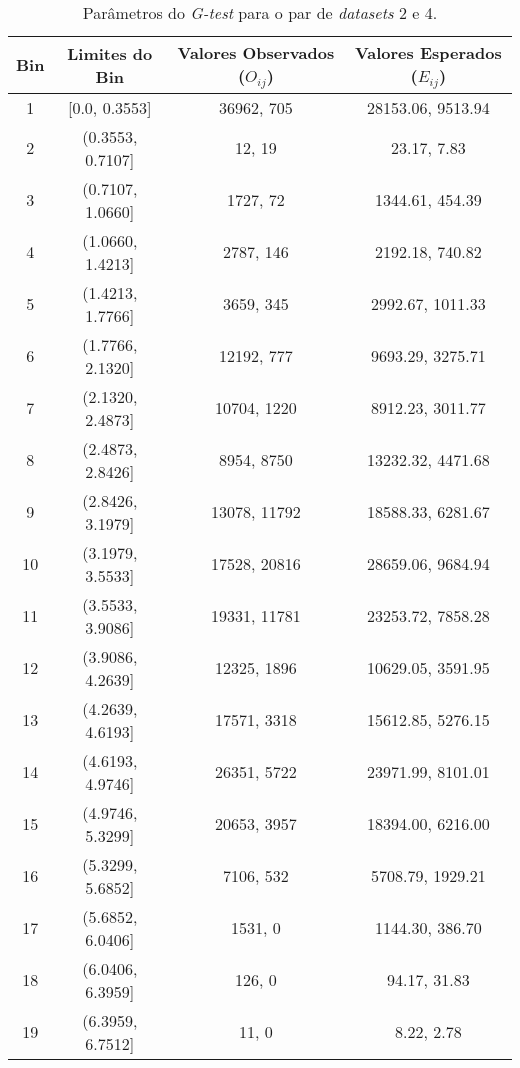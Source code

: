 \begin{table}[H]
    \centering
    \caption{Parâmetros do \textit{G-test} para o par de \textit{datasets} 2 e 4.}
    \label{tab:g_test_parameters_24}
    \begin{tabular}{|c|c|c|c|}
    \hline
    \textbf{Bin} & \textbf{Limites do Bin} & \textbf{Valores Observados ($O_{ij}$)} & \textbf{Valores Esperados ($E_{ij}$)} \\ \hline
    1  & [0.0, 0.3553]      & 36962, 705       & 28153.06, 9513.94       \\ \hline
     2  & (0.3553, 0.7107]   & 12, 19           & 23.17, 7.83             \\ \hline
     3  & (0.7107, 1.0660]   & 1727, 72         & 1344.61, 454.39         \\ \hline
     4  & (1.0660, 1.4213]   & 2787, 146        & 2192.18, 740.82         \\ \hline
     5  & (1.4213, 1.7766]   & 3659, 345        & 2992.67, 1011.33        \\ \hline
     6  & (1.7766, 2.1320]   & 12192, 777       & 9693.29, 3275.71        \\ \hline
     7  & (2.1320, 2.4873]   & 10704, 1220      & 8912.23, 3011.77        \\ \hline
     8  & (2.4873, 2.8426]   & 8954, 8750       & 13232.32, 4471.68       \\ \hline
     9  & (2.8426, 3.1979]   & 13078, 11792     & 18588.33, 6281.67       \\ \hline
     10 & (3.1979, 3.5533]   & 17528, 20816     & 28659.06, 9684.94       \\ \hline
     11 & (3.5533, 3.9086]   & 19331, 11781     & 23253.72, 7858.28       \\ \hline
     12 & (3.9086, 4.2639]   & 12325, 1896      & 10629.05, 3591.95       \\ \hline
     13 & (4.2639, 4.6193]   & 17571, 3318      & 15612.85, 5276.15       \\ \hline
     14 & (4.6193, 4.9746]   & 26351, 5722      & 23971.99, 8101.01       \\ \hline
     15 & (4.9746, 5.3299]   & 20653, 3957      & 18394.00, 6216.00       \\ \hline
     16 & (5.3299, 5.6852]   & 7106, 532        & 5708.79, 1929.21        \\ \hline
     17 & (5.6852, 6.0406]   & 1531, 0          & 1144.30, 386.70         \\ \hline
     18 & (6.0406, 6.3959]   & 126, 0           & 94.17, 31.83            \\ \hline
     19 & (6.3959, 6.7512]   & 11, 0            & 8.22, 2.78              \\ \hline
    \end{tabular}
\end{table}
    
